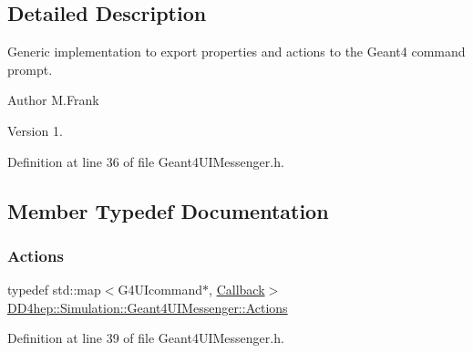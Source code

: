 \subsection{Detailed Description}
Generic implementation to export properties and actions to the Geant4 command prompt. 

\begin{DoxyAuthor}{Author}
M.\+Frank 
\end{DoxyAuthor}
\begin{DoxyVersion}{Version}
1. 
\end{DoxyVersion}


Definition at line 36 of file Geant4\+U\+I\+Messenger.\+h.



\subsection{Member Typedef Documentation}
\hypertarget{class_d_d4hep_1_1_simulation_1_1_geant4_u_i_messenger_a91b01eab1bb56af8661d2c99660211cd}{}\label{class_d_d4hep_1_1_simulation_1_1_geant4_u_i_messenger_a91b01eab1bb56af8661d2c99660211cd} 
\subsubsection{\texorpdfstring{Actions}{Actions}}
{\footnotesize\ttfamily typedef std\+::map$<$G4\+U\+Icommand$\ast$, \hyperlink{class_d_d4hep_1_1_callback}{Callback}$>$ \hyperlink{class_d_d4hep_1_1_simulation_1_1_geant4_u_i_messenger_a91b01eab1bb56af8661d2c99660211cd}{D\+D4hep\+::\+Simulation\+::\+Geant4\+U\+I\+Messenger\+::\+Actions}}



Definition at line 39 of file Geant4\+U\+I\+Messenger.\+h.

\hypertarget{class_d_d4hep_1_1_simulation_1_1_geant4_u_i_messenger_a07e66059e5542ef6c393fda188f44907}{}\label{class_d_d4hep_1_1_simulation_1_1_geant4_u_i_messenger_a07e66059e5542ef6c393fda188f44907} 

